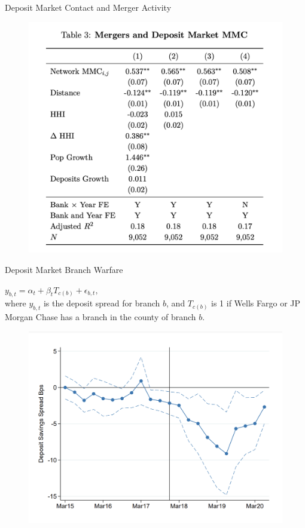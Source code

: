 \documentclass[notes,10.2pt, aspectratio=169]{beamer}
\newenvironment{wideitemize}{\itemize\addtolength{\itemsep}{10pt}}{\enditemize}
\begin{document}
\begin{frame}{Deposit Market Contact and Merger Activity}
  \vspace{0.1cm}


\begin{figure}[t*]
  \centering
  \includegraphics[width=.55\textwidth]{./imgs/table3.png}
\end{figure}


\end{frame}

\begin{frame}{Deposit Market Branch Warfare}

  \begin{wideitemize}
  \item $
  y_{b, t}=\alpha_t+\beta_t T_{c(b)}+\epsilon_{b, t},
  $\\
  where $y_{b, t}$ is the deposit spread for branch $b$, and $T_{c(b)}$ is 1 if Wells Fargo or JP Morgan Chase has a branch in the county of branch $b$.
\end{wideitemize}


\begin{figure}[t*]
  \centering
  \includegraphics[width=.55\textwidth]{./imgs/figure7.png}
\end{figure}

\end{frame}
\end{document}
